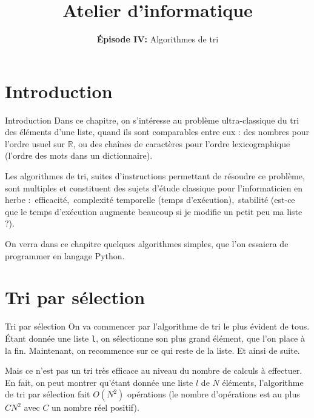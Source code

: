 \documentclass[10pt,xcolor={dvipsnames}]{beamer}
\title{Atelier d'informatique}
\subtitle{\textbf{Épisode IV:} Algorithmes de tri}
\newcommand{\R}{\mathbb R}
\begin{document}
\begin{frame}
	\titlepage
\end{frame}

\frame{\tableofcontents}

\section{Introduction}

\begin{frame}{Introduction}
	Dans ce chapitre, on s'intéresse au problème ultra-classique du tri des éléments d'une liste, quand ils sont comparables entre eux : des nombres pour l'ordre usuel sur $\R$, ou des chaînes de caractères pour l'ordre lexicographique (l'ordre des mots dans un dictionnaire).
	\pause
	
	Les algorithmes de tri, suites d'instructions permettant de résoudre ce problème, sont multiples et constituent des sujets d'étude classique pour l'informaticien en herbe :\pause\, efficacité,\pause\, complexité temporelle (temps d'exécution),\pause\, stabilité (est-ce que le temps d'exécution augmente beaucoup si je modifie un petit peu ma liste ?).
	\pause
	
	On verra dans ce chapitre quelques algorithmes simples, que l'on essaiera de programmer en langage Python.
\end{frame}

\section{Tri par sélection}

\begin{frame}{Tri par sélection}
	On va commencer par l'algorithme de tri le plus évident de tous. Étant donnée une liste \lstinline|l|, on sélectionne son plus grand élément, que l'on place à la fin. Maintenant, on recommence sur ce qui reste de la liste. Et ainsi de suite.
	\pause
	
	Mais ce n'est pas un tri très efficace au niveau du nombre de calculs à effectuer. En fait, on peut montrer qu'étant donnée une liste $l$ de $N$ éléments, l'algorithme de tri par sélection fait $O(N^2)$ opérations (le nombre d'opérations est au plus $CN^2$ avec $C$ un nombre réel positif).
\end{frame}
\end{document}
